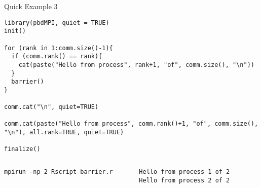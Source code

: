 \begin{frame}
  \begin{exampleblock}{Quick Example 3}
\begin{lstlisting}[title=Barrier: 3\_barrier.r]
library(pbdMPI, quiet = TRUE)
init()

for (rank in 1:comm.size()-1){
  if (comm.rank() == rank){
    cat(paste("Hello from process", rank+1, "of", comm.size(), "\n"))
  }
  barrier()
}

comm.cat("\n", quiet=TRUE)

comm.cat(paste("Hello from process", comm.rank()+1, "of", comm.size(), "\n"), all.rank=TRUE, quiet=TRUE)

finalize()
\end{lstlisting}
  \begin{columns}[t,onlytextwidth]
    \begin{column}{0.58\textwidth}
\begin{lstlisting}[backgroundcolor=\color{white},keywordstyle=\color{black},title=Execute this script via:]
mpirun -np 2 Rscript barrier.r
\end{lstlisting}
    \end{column}
    \hfill
    \begin{column}{0.4\textwidth}
\begin{lstlisting}[title=Sample Output:]
Hello from process 1 of 2 
Hello from process 2 of 2 
\end{lstlisting}
    \end{column}
​  \end{columns}
  \end{exampleblock}
\end{frame}


